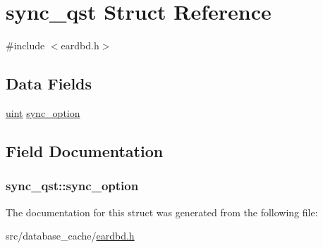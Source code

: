 \hypertarget{structsync__qst}{}\section{sync\+\_\+qst Struct Reference}
\label{structsync__qst}


{\ttfamily \#include $<$eardbd.\+h$>$}

\subsection*{Data Fields}
\begin{DoxyCompactItemize}
\item 
\hyperlink{generic_8h_a91ad9478d81a7aaf2593e8d9c3d06a14}{uint} \hyperlink{structsync__qst_a9c35747cd33208c54bed721ccb69d987}{sync\+\_\+option}
\end{DoxyCompactItemize}


\subsection{Field Documentation}
\subsubsection[{\texorpdfstring{sync\+\_\+option}{sync_option}}]{ sync\+\_\+qst\+::sync\+\_\+option}\hypertarget{structsync__qst_a9c35747cd33208c54bed721ccb69d987}{}\label{structsync__qst_a9c35747cd33208c54bed721ccb69d987}


The documentation for this struct was generated from the following file\+:\begin{DoxyCompactItemize}
\item 
src/database\+\_\+cache/\hyperlink{eardbd_8h}{eardbd.\+h}\end{DoxyCompactItemize}
